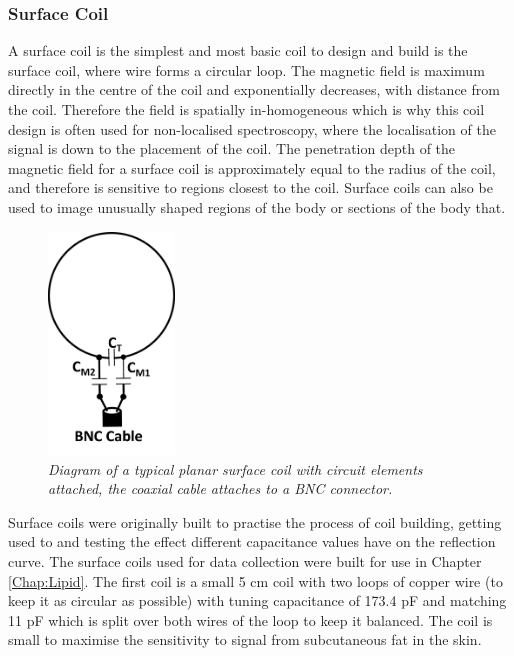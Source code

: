 \documentclass[class=article, crop=false]{standalone}
\begin{document}
\subsubsection{Surface Coil}
\label{Chap:Theory:Coils}

A surface coil is the simplest and most basic coil to design and build is the surface coil, where wire forms a circular loop. The magnetic field is maximum directly in the centre of the coil and exponentially decreases, with distance from the coil. Therefore the field is spatially in-homogeneous which is why this coil design is often used for non-localised spectroscopy, where the localisation of the signal is down to the placement of the coil. The penetration depth of the magnetic field for a surface coil is approximately equal to the radius of the coil, and therefore is sensitive to regions closest to the coil. Surface coils can also be used to image unusually shaped regions of the body or sections of the body that.

\begin{figure}
    \centering
    \includegraphics[width=0.3\textwidth]{Figures/Theory/Surface_Coil.png}
    \caption{\textit{Diagram of a typical planar surface coil with circuit elements attached, the coaxial cable attaches to a BNC connector.}}
    \label{fig:theory:Surface}
\end{figure}

Surface coils were originally built to practise the process of coil building, getting used to and testing the effect different capacitance values have on the reflection curve. The surface coils used for data collection were built for use in Chapter \ref{Chap:Lipid}. The first coil is a small 5 cm coil with two loops of copper wire (to keep it as circular as possible) with tuning capacitance of 173.4 pF and matching 11 pF which is split over both wires of the loop to keep it balanced. The coil is small to maximise the sensitivity to signal from subcutaneous fat in the skin.
\end{document}

